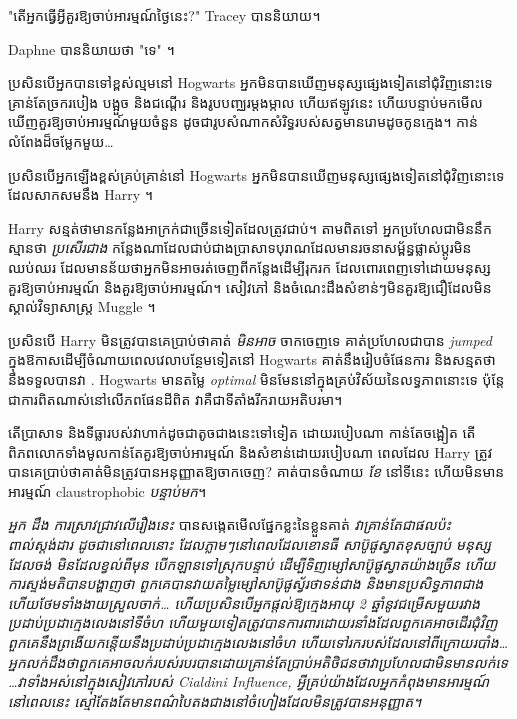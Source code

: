 {{{{{{

"តើអ្នកធ្វើអ្វីគួរឱ្យចាប់អារម្មណ៍ថ្ងៃនេះ?" Tracey បាននិយាយ។

Daphne បាននិយាយថា "ទេ" ។


ប្រសិនបើអ្នកបានទៅខ្ពស់ល្មមនៅ Hogwarts អ្នកមិនបានឃើញមនុស្សផ្សេងទៀតនៅជុំវិញនោះទេ គ្រាន់តែច្រករបៀង បង្អួច និងជណ្តើរ និងរូបបញ្ឈរម្តងម្កាល ហើយឥឡូវនេះ ហើយបន្ទាប់មកមើលឃើញគួរឱ្យចាប់អារម្មណ៍មួយចំនួន ដូចជារូបសំណាកសំរិទ្ធរបស់សត្វមានរោមដូចកូនក្មេង។ កាន់លំពែងដ៏ចម្លែកមួយ…

ប្រសិនបើអ្នកឡើងខ្ពស់គ្រប់គ្រាន់នៅ Hogwarts អ្នកមិនបានឃើញមនុស្សផ្សេងទៀតនៅជុំវិញនោះទេ ដែលសាកសមនឹង Harry ។

Harry សន្មត់ថាមានកន្លែងអាក្រក់ជាច្រើនទៀតដែលត្រូវជាប់។ តាមពិតទៅ អ្នកប្រហែលជាមិននឹកស្មានថា \emph{ប្រសើរជាង} កន្លែងណាដែលជាប់ជាងប្រាសាទបុរាណដែលមានរចនាសម្ព័ន្ធផ្លាស់ប្តូរមិនឈប់ឈរ ដែលមានន័យថាអ្នកមិនអាចរត់ចេញពីកន្លែងដើម្បីរុករក ដែលពោរពេញទៅដោយមនុស្សគួរឱ្យចាប់អារម្មណ៍ និងគួរឱ្យចាប់អារម្មណ៍។ សៀវភៅ និងចំណេះដឹងសំខាន់ៗមិនគួរឱ្យជឿដែលមិនស្គាល់វិទ្យាសាស្ត្រ Muggle ។

ប្រសិនបើ Harry មិនត្រូវបានគេប្រាប់ថាគាត់ \emph{មិនអាច} ចាកចេញទេ គាត់ប្រហែលជាបាន \emph{jumped} ក្នុងឱកាសដើម្បីចំណាយពេលវេលាបន្ថែមទៀតនៅ Hogwarts គាត់នឹងរៀបចំផែនការ និងសន្មតថានឹងទទួលបានវា . Hogwarts មានតម្លៃ \emph{optimal} មិនមែននៅក្នុងគ្រប់វិស័យនៃលទ្ធភាពនោះទេ ប៉ុន្តែជាការពិតណាស់នៅលើភពផែនដីពិត វាគឺជាទីតាំងរីករាយអតិបរមា។

តើប្រាសាទ និងទីធ្លារបស់វាហាក់ដូចជាតូចជាងនេះទៅទៀត ដោយរបៀបណា កាន់តែចង្អៀត តើពិភពលោកទាំងមូលកាន់តែគួរឱ្យចាប់អារម្មណ៍ និងសំខាន់ដោយរបៀបណា ពេលដែល Harry ត្រូវបានគេប្រាប់ថាគាត់មិនត្រូវបានអនុញ្ញាតឱ្យចាកចេញ? គាត់បានចំណាយ \emph{ខែ} នៅទីនេះ ហើយមិនមានអារម្មណ៍ claustrophobic \emph{បន្ទាប់មក}។

\emph{អ្នក \emph{ដឹង} ការស្រាវជ្រាវលើរឿងនេះ} បានសង្កេតមើលផ្នែកខ្លះនៃខ្លួនគាត់ \emph{ វាគ្រាន់តែជាផលប៉ះពាល់ស្ដង់ដារ ដូចជានៅពេលនោះ ដែលភ្លាមៗនៅពេលដែលខោនធី សាប៊ូផូស្វាតខុសច្បាប់ មនុស្សដែលចង់ មិនដែលខ្វល់ពីមុន បើកឡានទៅស្រុកបន្ទាប់ ដើម្បីទិញម្សៅសាប៊ូផូស្វាតយ៉ាងច្រើន ហើយការស្ទង់មតិបានបង្ហាញថា ពួកគេបានវាយតម្លៃម្សៅសាប៊ូផូស្វ័រថាទន់ជាង និងមានប្រសិទ្ធភាពជាង ហើយថែមទាំងងាយស្រួលចាក់… ហើយប្រសិនបើអ្នកផ្តល់ឱ្យក្មេងអាយុ 2 ឆ្នាំនូវជម្រើសមួយរវាង ប្រដាប់ប្រដាក្មេងលេងនៅទីចំហ ហើយមួយទៀតត្រូវបានការពារដោយរនាំងដែលពួកគេអាចដើរជុំវិញ ពួកគេនឹងព្រងើយកន្តើយនឹងប្រដាប់ប្រដាក្មេងលេងនៅចំហ ហើយទៅរករបស់ដែលនៅពីក្រោយរបាំង… អ្នកលក់ដឹងថាពួកគេអាចលក់របស់របរបានដោយគ្រាន់តែប្រាប់អតិថិជនថាវាប្រហែលជាមិនមានលក់ទេ …វាទាំងអស់នៅក្នុងសៀវភៅរបស់ Cialdini \emph{Influence,} អ្វីគ្រប់យ៉ាងដែលអ្នកកំពុងមានអារម្មណ៍នៅពេលនេះ ស្មៅតែងតែមានពណ៌បៃតងជាងនៅចំហៀងដែលមិនត្រូវបានអនុញ្ញាត។}

}}}}}}
